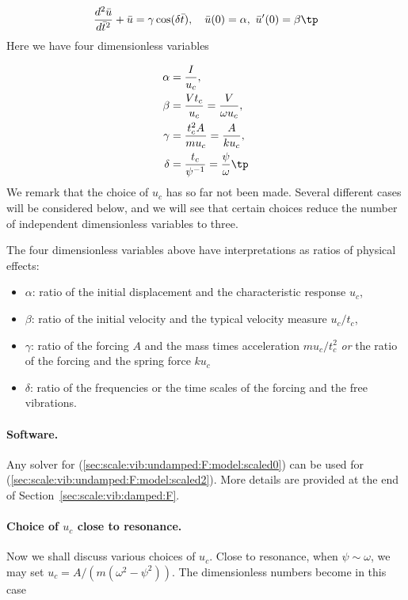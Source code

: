 \documentclass[graybox,envcountchap,sectrefs,final]{svmonodo}
\begin{document}
\begin{equation}
\frac{d^2\bar u}{d\bar t^2} + \bar u =
\gamma
\cos(\delta\bar t),
\quad \bar u(0)=\alpha,\ \bar u'(0)=\beta\tp
\label{sec:scale:vib:undamped:F:model:scaled2}
\end{equation}
Here we have four dimensionless variables

\begin{align}
\alpha &= \frac{I}{u_c},\\ 
\beta  &= \frac{Vt_c}{u_c} = \frac{V}{\omega u_c},\\ 
\gamma &= \frac{t_c^2 A}{mu_c} = \frac{A}{ku_c},\\ 
\delta &= \frac{t_c}{\psi^{-1}} = \frac{\psi}{\omega}\tp
\end{align}
We remark that the choice of $u_c$ has so far not been made. Several
different cases will be considered below, and we will see that certain
choices reduce the number of independent dimensionless variables to
three.

The four dimensionless variables above have interpretations as ratios of
physical effects:

\begin{itemize}
 \item $\alpha$: ratio of the initial displacement and
   the characteristic response $u_c$,

 \item $\beta$: ratio of the initial velocity
   and the typical velocity measure $u_c/t_c$,

 \item $\gamma$: ratio of
   the forcing $A$ and the mass times acceleration $mu_c/t_c^2$ \emph{or}
   the ratio of the forcing and the spring force $ku_c$

 \item $\delta$: ratio of the
   frequencies or the time scales of the forcing and the free vibrations.
\end{itemize}

\noindent
\paragraph{Software.}
Any solver for (\ref{sec:scale:vib:undamped:F:model:scaled0})
can be used for (\ref{sec:scale:vib:undamped:F:model:scaled2}).
More details are provided at the end of
Section~\ref{sec:scale:vib:damped:F}.

\paragraph{Choice of $u_c$ close to resonance.}
Now we shall discuss various choices of $u_c$.
Close to resonance, when $\psi\sim\omega$, we may set
$u_c=A/(m(\omega^2 - \psi^2))$. The dimensionless numbers
become in this case
\end{document}
